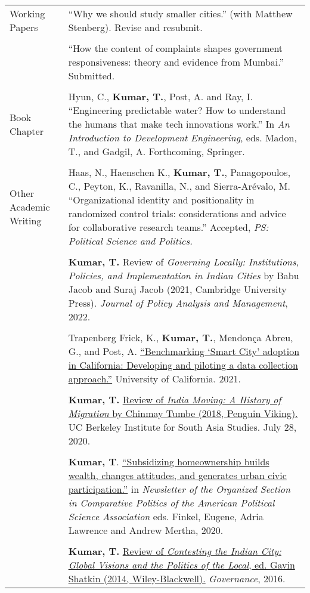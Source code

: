 \documentclass[letterpaper, 11pt]{article}
\begin{document}
\begin{longtable}{p{1in}p{5.5in}}
{{Working Papers}} 
& ``Why we should study smaller cities.'' (with Matthew Stenberg). Revise and resubmit. \\
& \\
& ``How the content of complaints shapes government responsiveness: theory and evidence from Mumbai.'' Submitted. \\
& \\


{{Book Chapter}} 
& Hyun, C., \textbf{Kumar, T.}, Post, A. and Ray, I. ``Engineering predictable water? How to understand the humans that make tech innovations work.'' In \textit{An Introduction to Development Engineering}, eds. Madon, T., and Gadgil, A. Forthcoming, Springer.\\

& \\

{{Other Academic Writing}} 
& Haas, N., Haenschen K., \textbf{Kumar, T.}, Panagopoulos, C., Peyton, K., Ravanilla, N., and Sierra-Ar\'{e}valo, M.  ``Organizational identity and positionality in randomized control trials: considerations and advice for collaborative research teams.'' Accepted, \textit{PS: Political Science and Politics.} \\
& \\


& \textbf{Kumar, T.} Review of \textit{Governing Locally: Institutions, Policies, and Implementation in Indian Cities} by Babu Jacob and Suraj Jacob (2021, Cambridge University Press).  \textit{Journal of Policy Analysis and Management}, 2022. \\


& \\

& Trapenberg Frick, K., \textbf{Kumar, T.}, Mendon\c{c}a Abreu, G., and Post, A. \href{https://escholarship.org/uc/item/3797p0ws}{``Benchmarking `Smart City' adoption in California: Developing and piloting a data collection approach.''} University of California. 2021. \\
& \\
& \textbf{Kumar, T.} \href{https://southasia.berkeley.edu/sites/default/files/shared/India_Center/India_Moving.pdf}{Review of \textit{India Moving: A History of Migration} by Chinmay Tumbe (2018, Penguin Viking).}  UC Berkeley Institute for South Asia Studies. July 28, 2020.\\
& \\

& \textbf{Kumar, T}.
 \href{https://www.comparativepoliticsnewsletter.org/wp-content/uploads/2020/05/Spring-Newsletter-2020.pdf}{``Subsidizing homeownership builds wealth, changes attitudes, and generates urban civic participation.''} in \textit{Newsletter of the Organized Section in Comparative Politics of the American Political Science Association} eds. Finkel, Eugene, Adria Lawrence and Andrew Mertha, 2020. \\
&\\
& \textbf{Kumar, T.} \href{http://onlinelibrary.wiley.com/doi/10.1111/gove.12241/abstract}{Review of \textit{Contesting the Indian City: Global Visions and the Politics of the Local}, ed. Gavin Shatkin (2014, Wiley-Blackwell).} \textit{Governance}, 2016. 


\end{longtable}
\end{document}
